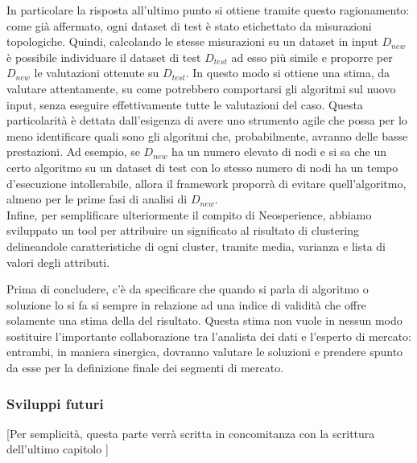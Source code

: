 In particolare la risposta all'ultimo punto si ottiene tramite questo ragionamento: come gi\`a affermato, ogni dataset di test \`e stato etichettato da misurazioni topologiche. Quindi, calcolando le stesse misurazioni su un dataset in input $ D_{new} $ \`e possibile individuare il dataset di test $ D_{test} $ ad esso pi\`u simile e proporre per $ D_{new} $ le valutazioni ottenute su $ D_{test} $. In questo modo si ottiene una stima, da valutare attentamente, su come potrebbero comportarsi gli algoritmi sul nuovo input, senza eseguire effettivamente tutte le valutazioni del caso. Questa particolarit\`a \`e dettata dall'esigenza di avere uno strumento agile che possa per lo meno identificare quali sono gli algoritmi che, probabilmente, avranno delle basse prestazioni. Ad esempio, se $ D_{new} $ ha un numero elevato di nodi e si sa che un certo algoritmo su un dataset di test con lo stesso numero di nodi ha un tempo d'esecuzione intollerabile, allora il framework proporr\`a di evitare quell'algoritmo, almeno per le prime fasi di analisi di $ D_{new} 
$.\\
Infine, per semplificare ulteriormente il compito di Neosperience, abbiamo sviluppato un tool per attribuire un significato  al risultato di clustering delineandole caratteristiche di ogni cluster, tramite media, varianza e lista di valori degli attributi.

Prima di concludere, c'\`e da specificare che quando si parla di algoritmo o soluzione  lo si fa si sempre in relazione ad una indice di validit\`a che offre solamente una stima della  del risultato. Questa stima non vuole in nessun modo sostituire l'importante collaborazione tra l'analista dei dati e l'esperto di mercato: entrambi, in maniera sinergica, dovranno valutare le soluzioni e prendere spunto da esse per la definizione finale dei segmenti di mercato.

\subsubsection{Sviluppi futuri}
[Per semplicit\`a, questa parte verr\`a scritta in concomitanza con la scrittura dell'ultimo capitolo ]



